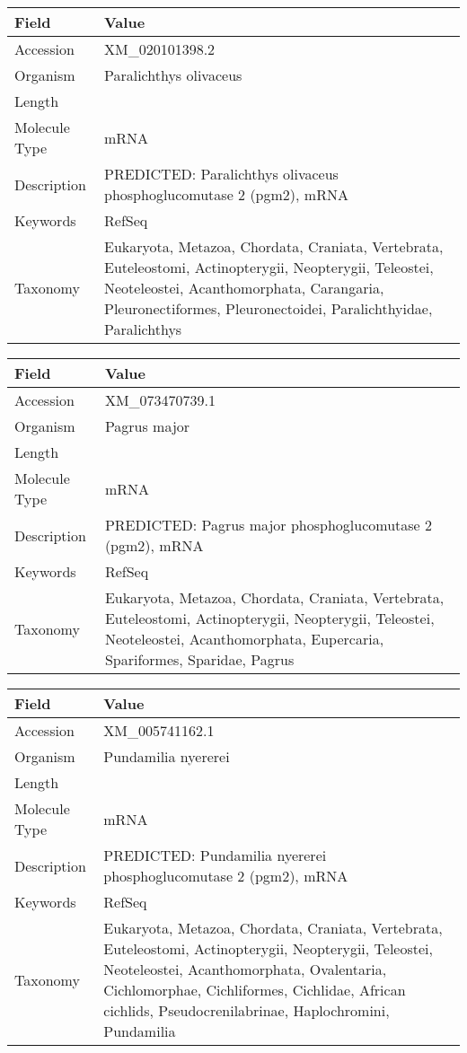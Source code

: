 \documentclass[10pt]{article}
\begin{document}
\vspace{1em}
{\footnotesize
\begin{longtable}{>{\raggedright\arraybackslash}p{4.5cm} >{\raggedright\arraybackslash}p{11.5cm}}
\textbf{Field} & \textbf{Value} \\
\hline
Accession & XM\_020101398.2 \\
Organism & Paralichthys olivaceus \\
Length & 2801 \\
Molecule Type & mRNA \\
Description & PREDICTED: Paralichthys olivaceus phosphoglucomutase 2 (pgm2), mRNA \\
Keywords & RefSeq \\
Taxonomy & Eukaryota, Metazoa, Chordata, Craniata, Vertebrata, Euteleostomi, Actinopterygii, Neopterygii, Teleostei, Neoteleostei, Acanthomorphata, Carangaria, Pleuronectiformes, Pleuronectoidei, Paralichthyidae, Paralichthys \\
\end{longtable}
}

\vspace{1em}
{\footnotesize
\begin{longtable}{>{\raggedright\arraybackslash}p{4.5cm} >{\raggedright\arraybackslash}p{11.5cm}}
\textbf{Field} & \textbf{Value} \\
\hline
Accession & XM\_073470739.1 \\
Organism & Pagrus major \\
Length & 2910 \\
Molecule Type & mRNA \\
Description & PREDICTED: Pagrus major phosphoglucomutase 2 (pgm2), mRNA \\
Keywords & RefSeq \\
Taxonomy & Eukaryota, Metazoa, Chordata, Craniata, Vertebrata, Euteleostomi, Actinopterygii, Neopterygii, Teleostei, Neoteleostei, Acanthomorphata, Eupercaria, Spariformes, Sparidae, Pagrus \\
\end{longtable}
}

\vspace{1em}
{\footnotesize
\begin{longtable}{>{\raggedright\arraybackslash}p{4.5cm} >{\raggedright\arraybackslash}p{11.5cm}}
\textbf{Field} & \textbf{Value} \\
\hline
Accession & XM\_005741162.1 \\
Organism & Pundamilia nyererei \\
Length & 2559 \\
Molecule Type & mRNA \\
Description & PREDICTED: Pundamilia nyererei phosphoglucomutase 2 (pgm2), mRNA \\
Keywords & RefSeq \\
Taxonomy & Eukaryota, Metazoa, Chordata, Craniata, Vertebrata, Euteleostomi, Actinopterygii, Neopterygii, Teleostei, Neoteleostei, Acanthomorphata, Ovalentaria, Cichlomorphae, Cichliformes, Cichlidae, African cichlids, Pseudocrenilabrinae, Haplochromini, Pundamilia \\
\end{longtable}
}
\end{document}
